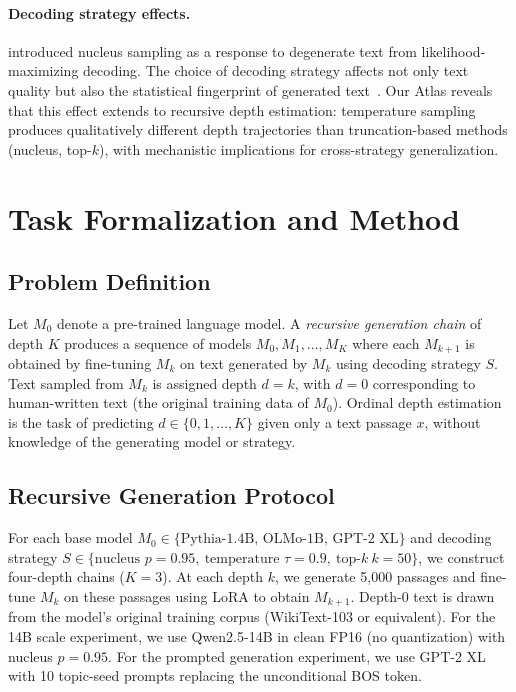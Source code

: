 \documentclass[11pt,a4paper]{article}
\begin{document}
\paragraph{Decoding strategy effects.}
\citet{holtzman2020curious} introduced nucleus sampling as a response to degenerate text from likelihood-maximizing decoding. The choice of decoding strategy affects not only text quality but also the statistical fingerprint of generated text~\citep{garcesarias2025coling}. Our Atlas reveals that this effect extends to recursive depth estimation: temperature sampling produces qualitatively different depth trajectories than truncation-based methods (nucleus, top-$k$), with mechanistic implications for cross-strategy generalization.

\section{Task Formalization and Method}

\subsection{Problem Definition}

Let $M_0$ denote a pre-trained language model. A \emph{recursive generation chain} of depth $K$ produces a sequence of models $M_0, M_1, \ldots, M_K$ where each $M_{k+1}$ is obtained by fine-tuning $M_k$ on text generated by $M_k$ using decoding strategy $S$. Text sampled from $M_k$ is assigned depth $d = k$, with $d = 0$ corresponding to human-written text (the original training data of $M_0$). Ordinal depth estimation is the task of predicting $d \in \{0, 1, \ldots, K\}$ given only a text passage $x$, without knowledge of the generating model or strategy.

\subsection{Recursive Generation Protocol}

For each base model $M_0 \in \{\text{Pythia-1.4B, OLMo-1B, GPT-2 XL}\}$ and decoding strategy $S \in \{\text{nucleus } p\!=\!0.95,\ \text{temperature } \tau\!=\!0.9,\ \text{top-}k\ k\!=\!50\}$, we construct four-depth chains ($K = 3$). At each depth $k$, we generate 5{,}000 passages and fine-tune $M_k$ on these passages using LoRA to obtain $M_{k+1}$. Depth-0 text is drawn from the model's original training corpus (WikiText-103 or equivalent). For the 14B scale experiment, we use Qwen2.5-14B in clean FP16 (no quantization) with nucleus $p = 0.95$. For the prompted generation experiment, we use GPT-2 XL with 10 topic-seed prompts replacing the unconditional BOS token.
\end{document}
